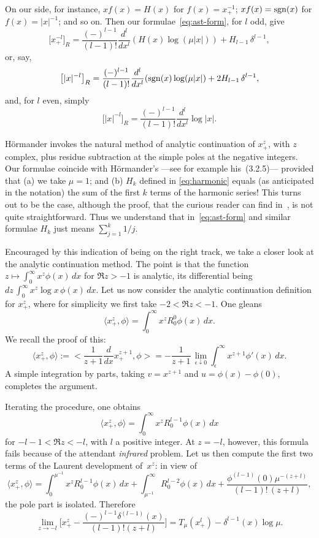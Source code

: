 \documentclass[a4paper,12pt]{article}
\newcommand{\dl}{\delta}           %
\newcommand{\eps}{\epsilon}        %
\newcommand{\sgn}{{\rm sgn}}       %
\newcommand{\7}{\dagger}           %
\def\<#1,#2>{\langle#1,#2\rangle}  %
\theoremstyle{plain}
\theoremstyle{definition}
\begin{document}
On our side, for instance, $xf(x) = H(x)$ for $f(x) = x_+^{-1}$;
$xf(x) = \sgn(x)$ for $f(x) = |x|^{-1}$; and so on. Then our
formulae~\eqref{eq:ast-form}, for $l$ odd, give
$$
\bigl[x_+^{-l}\bigr]_R =
\frac{(-)^{l-1}}{(l-1)!} \frac{d^l}{dx^l} (H(x) \log(\mu|x|))
+ H_{l-1}\,\dl^{l-1},
$$
or, say,
$$
\bigl[|x|^{-l}\bigr]_R =
\frac{(-)^{l-1}}{(l-1)!} \frac{d^l}{dx^l} (\sgn(x) \log(\mu|x|)
+ 2 H_{l-1}\,\dl^{l-1},
$$
and, for $l$ even, simply
\begin{equation}
\bigl[|x|^{-l}\bigr]_R =
\frac{(-)^{l-1}}{(l-1)!} \frac{d^l}{dx^l} \log|x|.
\label{eq:mag-simpl}
\end{equation}

H\"ormander invokes the natural method of analytic continuation of
$x_+^z$, with $z$ complex, plus residue subtraction at the simple
poles at the negative integers. Our formulae coincide with
H\"ormander's ---see for example his~(3.2.5)--- provided that (a) we
take $\mu = 1$; and (b) $H_k$ defined in \eqref{eq:harmonic} equals
(as anticipated in the notation) the sum of the first $k$ terms of the
harmonic series! This turns out to be the case, although the proof,
that the curious reader can find in~\cite[Ch.~6]{ThreefromTeX}, is not
quite straightforward. Thus we understand that in~\eqref{eq:ast-form}
and similar formulae $H_k$ just means $\sum_{j=1}^k 1/j$.

Encouraged by this indication of being on the right track, we take a
closer look at the analytic continuation method. The point is that the
function $z \mapsto \int_0^\infty x^z \phi(x)\,dx$ for $\Re z > -1$ is
analytic, its differential being
$dz\,\int_0^\infty x^z \log x\,\phi(x)\,dx$. Let us now consider the
analytic continuation definition for $x^z_+$, where for simplicity we
first take $-2 < \Re z < -1$. One gleans
$$
\<x^z_+, \phi> = \int_0^\infty x^z R^0_0\phi(x) \,dx.
$$
We recall the proof of this:
$$
\<x^z_+, \phi> :=
\biggl< \frac{1}{z+1} \frac{d}{dx} x^{z+1}_+, \phi\biggr> =
- \frac{1}{z+1}\,\lim_{\eps\downarrow0} \int_\eps^\infty
x^{z+1} \phi'(x)\,dx.
$$
A simple integration by parts, taking $v = x^{z+1}$ and
$u = \phi(x) - \phi(0)$, completes the argument.

Iterating the procedure, one obtains
$$
\<x^z_+, \phi> = \int_0^\infty x^z R^{l-1}_0\phi(x)\,dx
$$
for $-l-1 < \Re z < -l$, with $l$ a positive integer. At $z = -l$,
however, this formula fails because of the attendant \textit{infrared}
problem. Let us then compute the first two terms of the Laurent
development of~$x^z$: in view of
$$
\<x^z_+, \phi> = \int_0^{\mu^{-1}} x^z R^{l-1}_0\phi(x)\,dx +
\int_{\mu^{-1}}^\infty R^{l-2}_0\phi(x)\,dx
+ \frac{\phi^{(l-1)}(0)\mu^{-(z+l)}}{(l-1)!\,(z+l)},
$$
the pole part is isolated. Therefore
$$
\lim_{z\to-l} \biggl[x_+^z -
\frac{(-)^{l-1}\dl^{(l-1)}(x)}{(l-1)!(z+l)} \biggr] =
T_\mu(x^l_+) - \dl^{l-1}(x) \log\mu.
$$
\end{document}
